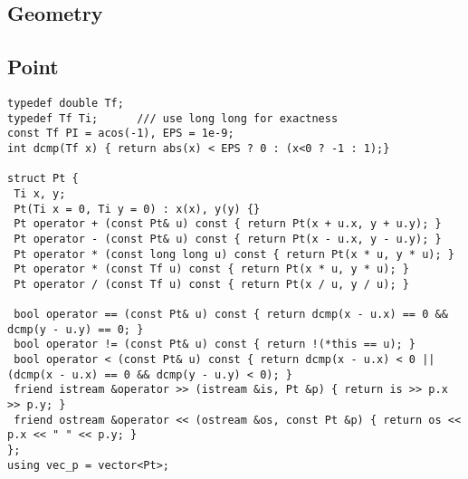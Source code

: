 \documentclass[a4paper,11pt,oneside]{article}
\begin{document}
\begin{multicols*}{\COLS}
\section{Geometry}
\subsection{Point}
\begin{lstlisting}
typedef double Tf;
typedef Tf Ti;      /// use long long for exactness
const Tf PI = acos(-1), EPS = 1e-9;
int dcmp(Tf x) { return abs(x) < EPS ? 0 : (x<0 ? -1 : 1);}

struct Pt {
 Ti x, y;
 Pt(Ti x = 0, Ti y = 0) : x(x), y(y) {}
 Pt operator + (const Pt& u) const { return Pt(x + u.x, y + u.y); }
 Pt operator - (const Pt& u) const { return Pt(x - u.x, y - u.y); }
 Pt operator * (const long long u) const { return Pt(x * u, y * u); }
 Pt operator * (const Tf u) const { return Pt(x * u, y * u); }
 Pt operator / (const Tf u) const { return Pt(x / u, y / u); }

 bool operator == (const Pt& u) const { return dcmp(x - u.x) == 0 && dcmp(y - u.y) == 0; }
 bool operator != (const Pt& u) const { return !(*this == u); }
 bool operator < (const Pt& u) const { return dcmp(x - u.x) < 0 || (dcmp(x - u.x) == 0 && dcmp(y - u.y) < 0); }
 friend istream &operator >> (istream &is, Pt &p) { return is >> p.x >> p.y; }
 friend ostream &operator << (ostream &os, const Pt &p) { return os << p.x << " " << p.y; }
};
using vec_p = vector<Pt>;


\end{lstlisting}
\end{multicols*}
\end{document}
